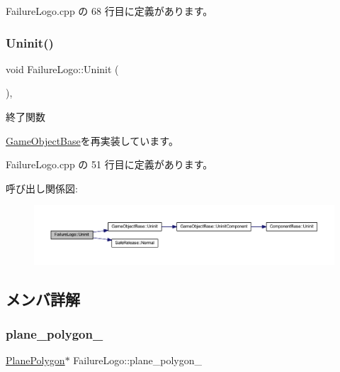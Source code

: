  Failure\+Logo.\+cpp の 68 行目に定義があります。

\mbox{\label{class_failure_logo_adbe01fc4567ade0e788f511f5162299c}} 
\subsubsection{\texorpdfstring{Uninit()}{Uninit()}}
{\footnotesize\ttfamily void Failure\+Logo\+::\+Uninit (\begin{DoxyParamCaption}{ }\end{DoxyParamCaption})\hspace{0.3cm}{\ttfamily [override]}, {\ttfamily [virtual]}}



終了関数 



\mbox{\hyperlink{class_game_object_base_a97e1bc277d7b1c0156d4735de29a022c}{Game\+Object\+Base}}を再実装しています。



 Failure\+Logo.\+cpp の 51 行目に定義があります。

呼び出し関係図\+:\nopagebreak
\begin{figure}[H]
\begin{center}
\leavevmode
\includegraphics[width=350pt]{class_failure_logo_adbe01fc4567ade0e788f511f5162299c_cgraph}
\end{center}
\end{figure}


\subsection{メンバ詳解}
\mbox{\label{class_failure_logo_ab41feac9836e9687c75546098ff8f53c}} 
\subsubsection{\texorpdfstring{plane\+\_\+polygon\+\_\+}{plane\_polygon\_}}
{\footnotesize\ttfamily \mbox{\hyperlink{class_plane_polygon}{Plane\+Polygon}}$\ast$ Failure\+Logo\+::plane\+\_\+polygon\+\_\+}



